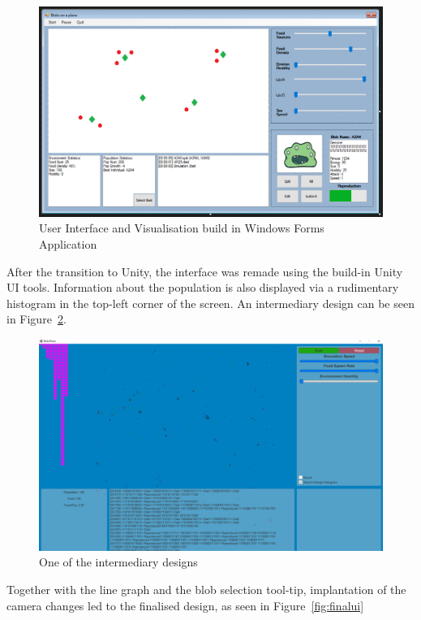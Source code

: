 \begin{figure}[!th]
	\centering
	\includegraphics[scale=0.45]{images/uitest}
	\caption{\label{fig:uitest}User Interface and Visualisation build in Windows Forms Application}
\end{figure}

After the transition to Unity, the interface was remade using the build-in Unity UI tools. Information about the population is also displayed via a rudimentary histogram in the top-left corner of the screen. An intermediary design can be seen in Figure~\ref{fig:unitypart}. 

\begin{figure}[!th]
	\centering
	\includegraphics[scale=0.3]{images/unitypart}
	\caption{\label{fig:unitypart}One of the intermediary designs}
\end{figure}

Together with the line graph and the blob selection tool-tip, implantation of the camera changes led to the finalised design, as seen in Figure~\ref{fig:finalui}

